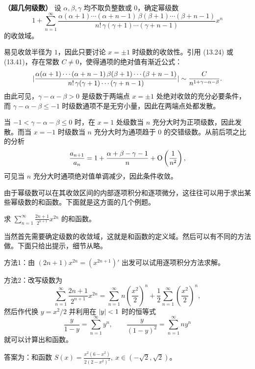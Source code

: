 \begin{xexample}[14.3.2]
\textbf{（超几何级数）} 设 $\alpha,\beta,\gamma$ 均不取负整数或 $0$，确定幂级数
\[
  1+\sum_{n=1}^{\infty}\frac{\alpha(\alpha+1)\cdots(\alpha+n-1)\,\beta(\beta+1)\cdots(\beta+n-1)}{n!\,\gamma(\gamma+1)\cdots(\gamma+n-1)}x^n
\]
的收敛域。
\end{xexample}
\begin{xsolution}
易见收敛半径为 $1$，因此只要讨论 $x=\pm1$ 时级数的收敛性。引用 (13.24) 或 (13.41)，存在常数 $C\ne0$，使得通项的绝对值有渐近公式：
\[
  \lvert\frac{\alpha(\alpha+1)\cdots(\alpha+n-1)\,\beta(\beta+1)\cdots(\beta+n-1)}{n!\,\gamma(\gamma+1)\cdots(\gamma+n-1)}\rvert
  \sim\frac{C}{n^{1+\gamma-\alpha-\beta}}.
\]
由此可见，$\gamma-\alpha-\beta>0$ 是级数于两端点 $x=\pm1$ 处绝对收敛的充分必要条件，而 $\gamma-\alpha-\beta\leqslant-1$ 时级数通项不是无穷小量，因此在两端点处都发散。

当 $-1<\gamma-\alpha-\beta\leqslant0$ 时，在 $x=1$ 处级数当 $n$ 充分大时为正项级数，因此发散。而当 $x=-1$ 时级数当 $n$ 充分大时为通项趋于 $0$ 的交错级数。从前后项之比的分析
\[
  \frac{a_{n+1}}{a_n}=1+\frac{\alpha+\beta-\gamma-1}{n}+\mathrm{O}\left(\frac1{n^2}\right),
\]
可见当 $n$ 充分大时通项绝对值单调减少，因此条件收敛。
\end{xsolution}

由于幂级数可以在其收敛区间的内部逐项积分和逐项微分，这往往可以用于求出某些幂级数的和函数。下面就是这方面的几个例题。

\begin{xexample}[14.3.3]
求 $\displaystyle\sum_{n=1}^{\infty}\frac{2n+1}{2^{n+1}}x^{2n}$ 的和函数。
\end{xexample}
\begin{xsolution}
当然首先需要确定级数的收敛域，这就是和函数的定义域。然后可以有不同的方法做。下面只给出提示，细节从略。

方法1：由 $(2n+1)x^{2n}=(x^{2n+1})'$ 出发可以试用逐项积分方法求解。

方法2：改写级数为
\[
  \sum_{n=1}^{\infty}\frac{2n+1}{2^{n+1}}x^{2n}
  =\sum_{n=1}^{\infty}n\left(\frac{x^2}{2}\right)^n
  +\frac12\sum_{n=1}^{\infty}\left(\frac{x^2}{2}\right)^n,
\]
然后作代换 $y=x^2/2$ 并利用在 $\lvert y\rvert<1$ 时的恒等式
\[
  \frac{y}{1-y}=\sum_{n=1}^{\infty}y^n,
  \qquad
  \frac{y}{(1-y)^2}=\sum_{n=1}^{\infty}ny^n
\]
就可以计算出和函数。

答案为：和函数 $\displaystyle S(x)=\frac{x^2(6-x^2)}{2(2-x^2)^2},\ x\in(-\sqrt2,\sqrt2)$。
\end{xsolution}

